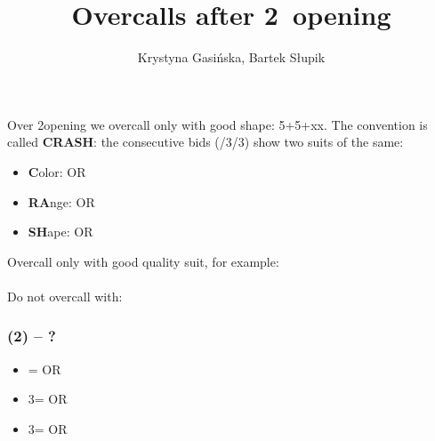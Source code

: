 \documentclass[12pt, a4paper]{article}
\title{Overcalls after 2\ntx\ opening}
\author{Krystyna Gasińska, Bartek Słupik}
\begin{document}
\maketitle

Over 2\nt opening we overcall only with good shape: 5+5+xx.
The convention is called {\color{Red}\textbf{C}}{\color{Green}\textbf{RA}}{\color{Blue}\textbf{SH}}:
the consecutive bids (\dbl/3\clubs/3\diams) show two suits of the same: 
\begin{itemize}
    \item {\color{Red}\textbf{C}}olor: \twosuit{\clubs}{\spades} OR \twosuit{\diams}{\hearts}
    \item {\color{Green}\textbf{RA}}nge: \twosuit{\clubs}{\diams} OR \twosuit{\hearts}{\spades}
    \item {\color{Blue}\textbf{SH}}ape: \twosuit{\clubs}{\hearts} OR \twosuit{\diams}{\spades}
\end{itemize}
Overcall only with good quality suit, for example:\\
\\
Do not overcall with:\\


\subsubsection*{(2\nt) -- ?}
\begin{itemize}
    \item \dbl = \twosuit{\clubs}{\spades} OR \twosuit{\diams}{\hearts}
    \item 3\clubs = \twosuit{\clubs}{\diams} OR \twosuit{\hearts}{\spades}
    \item 3\diams = \twosuit{\clubs}{\hearts} OR \twosuit{\diams}{\spades}
\end{itemize}

\end{document}
